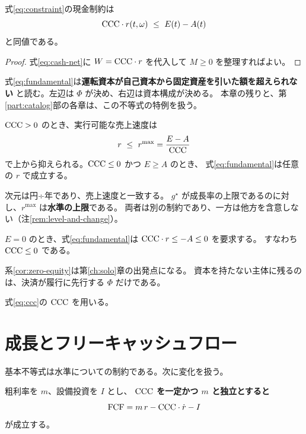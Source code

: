 \begin{proposition}[基本不等式]
\label{prop:fundamental}
式\eqref{eq:constraint}の現金制約は
\begin{equation}
\mathrm{CCC}\cdot r(t,\omega) \ \leq\ E(t) - A(t)
\label{eq:fundamental}
\end{equation}
と同値である。
\end{proposition}

\begin{proof}
式\eqref{eq:cash-net}に $W=\mathrm{CCC}\cdot r$ を代入して $M\geq 0$ を整理すればよい。
\end{proof}

式\eqref{eq:fundamental}は\textbf{運転資本が自己資本から固定資産を引いた額を超えられない}
と読む。左辺は $\Phi$ が決め、右辺は資本構成が決める。
本章の残りと、第\ref{part:catalog}部の各章は、この不等式の特例を扱う。

\begin{corollary}[規模の上限]
\label{cor:rmax}
$\mathrm{CCC}>0$ のとき、実行可能な売上速度は
\begin{equation}
r \ \leq\ r^{\max} = \frac{E-A}{\mathrm{CCC}}
\label{eq:rmax}
\end{equation}
で上から抑えられる。$\mathrm{CCC}\leq 0$ かつ $E\geq A$ のとき、
式\eqref{eq:fundamental}は任意の $r$ で成立する。
\end{corollary}

次元は円÷年であり、売上速度と一致する。
$g^\star$ が成長率の上限であるのに対し、$r^{\max}$ は\textbf{水準の上限}である。
両者は別の制約であり、一方は他方を含意しない（注\ref{rem:level-and-change}）。

\begin{corollary}
\label{cor:zero-equity}
$E=0$ のとき、式\eqref{eq:fundamental}は $\mathrm{CCC}\cdot r\leq -A\leq 0$ を要求する。
すなわち $\mathrm{CCC}\leq 0$ である。
\end{corollary}

系\ref{cor:zero-equity}は第\ref{ch:solo}章の出発点になる。
資本を持たない主体に残るのは、決済が履行に先行する $\Phi$ だけである。

式\eqref{eq:ccc}の $\mathrm{CCC}$ を用いる。

\section{成長とフリーキャッシュフロー}
\label{sec:fcf}

基本不等式は水準についての制約である。次に変化を扱う。

\begin{proposition}[成長とフリーキャッシュフロー]
\label{prop:fcf}
粗利率を $m$、設備投資を $I$ とし、
\textbf{$\mathrm{CCC}$ を一定かつ $m$ と独立とすると}
\begin{equation}
\FCF = m\,r - \CCC\cdot\dot{r} - I
\label{eq:fcf}
\end{equation}
が成立する。
\end{proposition}

